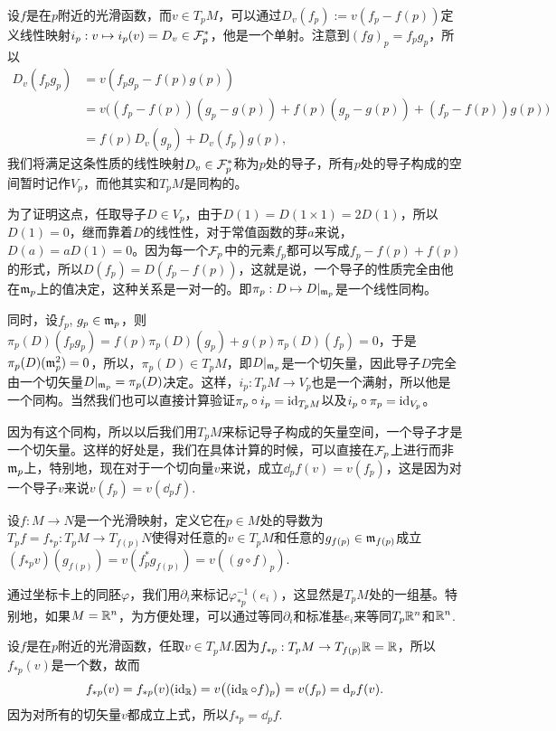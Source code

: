 设$f$是在$p$附近的光滑函数，而$v\in T_pM$，可以通过$D_v(f_p):=v(f_p-f(p))$定义线性映射$i_p:v\mapsto i_p(v)=D_v\in \mathcal{F}_p^*$，他是一个单射。注意到$(fg)_p=f_pg_p$，所以
\begin{align*}
	D_v(f_pg_p)&=v(f_pg_p-f(p)g(p))\\
	&=v\bigl((f_p-f(p))(g_p-g(p))+f(p)(g_p-g(p))+(f_p-f(p))g(p)\bigr)\\
	&=f(p)D_v(g_p)+D_v(f_p)g(p),
\end{align*}
我们将满足这条性质的线性映射$D_v\in \mathcal{F}_p^*$称为$p$处的导子，所有$p$处的导子构成的空间暂时记作$V_p$，而他其实和$T_pM$是同构的。

为了证明这点，任取导子$D\in V_p$，由于$D(1)=D(1\times 1)=2D(1)$，所以$D(1)=0$，继而靠着$D$的线性性，对于常值函数的芽$a$来说，$D(a)=aD(1)=0$。因为每一个$\mathcal{F}_p$中的元素$f_p$都可以写成$f_p-f(p)+f(p)$的形式，所以$D(f_p)=D(f_p-f(p))$，这就是说，一个导子的性质完全由他在$\mathfrak{m}_p$上的值决定，这种关系是一对一的。即$\pi_p:D\mapsto D|_{\mathfrak{m}_p}$是一个线性同构。

同时，设$f_p$, $g_p\in \mathfrak{m}_p$，则$\pi_p(D)(f_pg_p)=f(p)\pi_p(D)(g_p)+g(p)\pi_p(D)(f_p)=0$，于是$\pi_p(D)(\mathfrak{m}_p^2)=0$，所以，$\pi_p(D)\in T_pM$，即$D|_{\mathfrak{m}_p}$是一个切矢量，因此导子$D$完全由一个切矢量$D|_{\mathfrak{m}_p}=\pi_p(D)$决定。这样，$i_p:T_pM\to V_p$也是一个满射，所以他是一个同构。当然我们也可以直接计算验证$\pi_p\circ i_p=\operatorname{id}_{T_pM}$以及$i_p\circ \pi_p=\operatorname{id}_{V_p}$。

因为有这个同构，所以以后我们用$T_pM$来标记导子构成的矢量空间，一个导子才是一个切矢量。这样的好处是，我们在具体计算的时候，可以直接在$\mathcal{F}_p$上进行而非$\mathfrak{m}_p$上，特别地，现在对于一个切向量$v$来说，成立$\dd_pf(v)=v(f_p)$，这是因为对一个导子$v$来说$v(f_p)=v(\dd_pf)$.

\begin{para}
设$f:M\to N$是一个光滑映射，定义它在$p\in M$处的导数为$T_pf=f_{*p}:T_pM\to T_{f(p)}N$使得对任意的$v\in T_p M$和任意的$g_{f(p)}\in \mathfrak{m}_{f(p)}$成立$(f_{*p}v)(g_{f(p)})=v(f_p^*g_{f(p)})=v((g\circ f)_p)$.
\end{para}

通过坐标卡上的同胚$\varphi$，我们用$\partial_i$来标记$\varphi^{-1}_{*p}(e_i)$，这显然是$T_pM$处的一组基。特别地，如果$M=\mathbb{R}^n$，为方便处理，可以通过等同$\partial_i$和标准基$e_i$来等同$T_p\mathbb{R}^n$和$\mathbb{R}^n$. 

\para 设$f$是在$p$附近的光滑函数，任取$v\in T_pM$.因为$f_{*p}:T_pM\to T_{f(p)}\mathbb{R}=\mathbb{R}$，所以$f_{*p}(v)$是一个数，故而
\[
	f_{*p}(v)=f_{*p}(v)(\operatorname{id}_{\mathbb{R}})=v\bigl((\operatorname{id}_{\mathbb{R}}\circ f)_p\bigr)=v(f_p)=\mathrm{d}_p f(v).
\]
因为对所有的切矢量$v$都成立上式，所以$f_{*p}=\dd_p f$.


